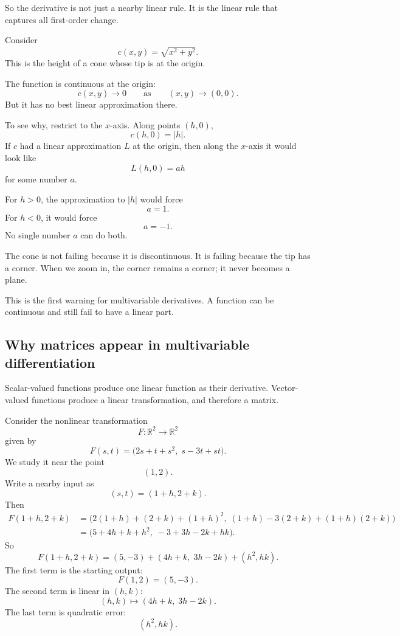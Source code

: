 So the derivative is not just a nearby linear rule.  It is the linear rule that captures all
first-order change.

\begin{example}
Consider
\[
    c(x,y)=\sqrt{x^2+y^2}.
\]
This is the height of a cone whose tip is at the origin.

The function is continuous at the origin:
\[
    c(x,y)\to0
    \qquad\text{as}\qquad
    (x,y)\to(0,0).
\]
But it has no best linear approximation there.

To see why, restrict to the \(x\)-axis.  Along points \((h,0)\),
\[
    c(h,0)=|h|.
\]
If \(c\) had a linear approximation \(L\) at the origin, then along the \(x\)-axis it would
look like
\[
    L(h,0)=ah
\]
for some number \(a\).

For \(h>0\), the approximation to \(|h|\) would force
\[
    a=1.
\]
For \(h<0\), it would force
\[
    a=-1.
\]
No single number \(a\) can do both.

The cone is not failing because it is discontinuous.  It is failing because the tip has a
corner.  When we zoom in, the corner remains a corner; it never becomes a plane.
\end{example}

This is the first warning for multivariable derivatives.  A function can be continuous
and still fail to have a linear part.

\subsection{Why matrices appear in multivariable differentiation}

Scalar-valued functions produce one linear function as their derivative.  Vector-valued
functions produce a linear transformation, and therefore a matrix.

Consider the nonlinear transformation
\[
    F:\mathbb R^2\to\mathbb R^2
\]
given by
\[
    F(s,t)=
    \bigl(2s+t+s^2,\;s-3t+st\bigr).
\]
We study it near the point
\[
    (1,2).
\]
Write a nearby input as
\[
    (s,t)=(1+h,2+k).
\]
Then
\[
\begin{aligned}
F(1+h,2+k)
&=
\bigl(2(1+h)+(2+k)+(1+h)^2,\;
(1+h)-3(2+k)+(1+h)(2+k)\bigr)\\
&=
\bigl(5+4h+k+h^2,\;-3+3h-2k+hk\bigr).
\end{aligned}
\]
So
\[
    F(1+h,2+k)
    =
    (5,-3)
    +
    (4h+k,\;3h-2k)
    +
    (h^2,hk).
\]
The first term is the starting output:
\[
    F(1,2)=(5,-3).
\]
The second term is linear in \((h,k)\):
\[
    (h,k)\longmapsto (4h+k,\;3h-2k).
\]
The last term is quadratic error:
\[
    (h^2,hk).
\]

